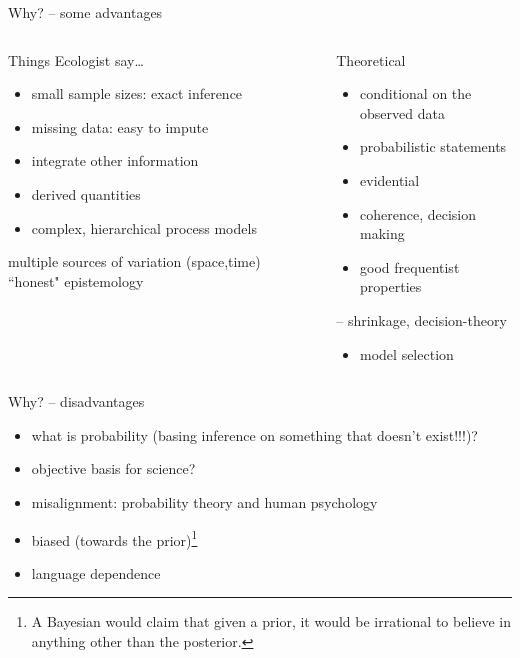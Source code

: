 \documentclass[presentation,9pt,xcolor=dvipsnames]{beamer}
\begin{document}
\begin{frame}[label={sec:org8dcd50d}]{Why? -- some advantages}
\begin{columns}
\begin{column}{0.55\columnwidth}
\begin{block}{Things Ecologist say\ldots{}}
\begin{itemize}
\item small sample sizes: exact inference
\item missing data: easy to impute
\item integrate other information
\item derived quantities
\item complex, hierarchical process models
\end{itemize}
multiple sources of variation (space,time)
``honest" epistemology
\end{block}
\end{column}
\begin{column}{0.45\columnwidth}
\begin{block}{Theoretical}
\begin{itemize}
\item conditional on the observed data
\item probabilistic statements
\item evidential
\item coherence, decision making
\item good frequentist properties
\end{itemize}
-- shrinkage, decision-theory
\begin{itemize}
\item model selection
\end{itemize}
\end{block}
\end{column}
\end{columns}
\end{frame}
\begin{frame}[label={sec:org69962c2}]{Why? -- disadvantages}
\begin{itemize}
\item what is probability (basing inference on something that doesn't exist!!!)?
\item objective basis for science?
\item misalignment: probability theory and human psychology
\item biased (towards the prior)\footnote{A Bayesian would claim that given a prior, it would be irrational to believe in anything other than the posterior.}
\item language dependence
\end{itemize}
\end{frame}
\end{document}
